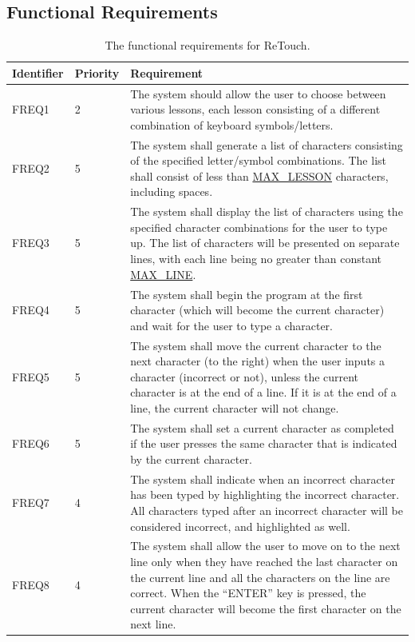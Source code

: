 \documentclass[12pt, titlepage]{article}
\begin{document}
\subsection{Functional Requirements}

\begin{longtable}{ |m{2cm}|m{1.8cm}|m{9.4cm}| }
\caption{The functional requirements for ReTouch.} \\
    \hline
    \textbf{Identifier} & \textbf{Priority} & \textbf{Requirement} \\ 
    \hline
    FREQ1 & 2 & The system should allow the user to choose between various lessons, each lesson consisting of a different combination of keyboard symbols/letters. \\ 
    \hline
    FREQ2 & 5 & The system shall generate a list of characters consisting of the specified letter/symbol combinations. The list shall consist of less than \hyperref[symbols]{MAX\_LESSON} characters, including spaces. \\ 
    \hline
    FREQ3 & 5 & The system shall display the list of characters using the specified character combinations for the user to type up. The list of characters will be presented on separate lines, with each line being no greater than constant \hyperref[symbols]{MAX\_LINE}.  \\ 
    \hline
    FREQ4 & 5 & The system shall begin the program at the first character (which will become the current character) and wait for the user to type a character. \\ 
    \hline
    FREQ5 & 5 & {\color{cyan}The system shall move the current character to the next character (to the right) when the user inputs a character (incorrect or not), unless the current character is at the end of a line. If it is at the end of a line, the current character will not change. }  \\ 
    \hline
    FREQ6 & 5 & The system shall set a current character as completed if the user presses the same character that is indicated by the current character. \\ 
    \hline
    FREQ7 & 4 & The system shall indicate when an incorrect character has been typed by highlighting the incorrect character. All characters typed after an incorrect character will be considered incorrect, and highlighted as well. \\ 
    \hline
    FREQ8 & 4 & The system shall allow the user to move on to the next line only when they have reached the last character on the current line and all the characters on the line are correct. When the “ENTER” key is pressed, the current character will become the first character on the next line. \\ 

\end{longtable}
\end{document}
